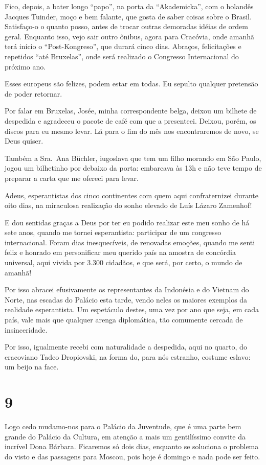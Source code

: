 Fico, depois, a bater longo ``papo'', na porta da ``Akademicka'', com o holandês Jacques Tuinder, moço e bem falante, que gosta de saber coisas sobre o Brasil. Satisfaço-o o quanto posso, antes de trocar outras demoradas idéias de ordem geral. Enquanto isso, vejo sair outro ônibus, agora para Cracóvia, onde amanhã terá início o ``Post-Kongreso'', que durará cinco dias. Abraços, felicitações e repetidos ``até Bruxelas'', onde será realizado o Congresso Internacional do próximo ano.

Esses europeus são felizes, podem estar em todas. Eu sepulto qualquer pretensão de poder retornar.

Por falar em Bruxelas, Josée, minha correspondente belga, deixou um bilhete de despedida e agradeceu o pacote de café com que a presenteei. Deixou, porém, os discos para eu mesmo levar. Lá para o fim do mês nos encontraremos de novo, se Deus quiser.

Também a Sra.~Ana Büchler, iugoslava que tem um filho morando em São Paulo, jogou um bilhetinho por debaixo da porta: embarcava às 13h e não teve tempo de preparar a carta que me ofereci para levar.

Adeus, esperantistas dos cinco continentes com quem aqui confraternizei durante oito dias, na miraculosa realização do sonho elevado de Luís Lázaro Zamenhof!

E dou sentidas graças a Deus por ter eu podido realizar este meu sonho de há sete anos, quando me tornei esperantista: participar de um congresso internacional. Foram dias inesquecíveis, de renovadas emoções, quando me senti feliz e honrado em personificar meu querido país na amostra de concórdia universal, aqui vivida por 3.300 cidadãos, e que será, por certo, o mundo de amanhã!

Por isso abracei efusivamente os representantes da Indonésia e do Vietnam do Norte, nas escadas do Palácio esta tarde, vendo neles os maiores exemplos da realidade esperantista. Um espetáculo destes, uma vez por ano que seja, em cada país, vale mais que qualquer arenga diplomática, tão comumente cercada de insinceridade.

Por isso, igualmente recebi com naturalidade a despedida, aqui no quarto, do cracoviano Tadeo Dropiovski, na forma do, para nós estranho, costume eslavo: um beijo na face.

\section*{9 \adfflatleafright {}}
Logo cedo mudamo-nos para o Palácio da Juventude, que é uma parte bem grande do Palácio da Cultura, em atenção a mais um gentilíssimo convite da incrível Dona Bárbara. Ficaremos só dois dias, enquanto se soluciona o problema do visto e das passagens para Moscou, pois hoje é domingo e nada pode ser feito.

